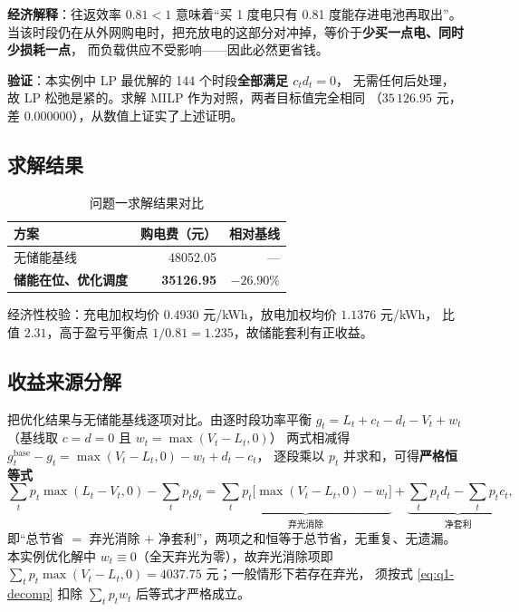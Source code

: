 \textbf{经济解释}：往返效率 $0.81<1$ 意味着“买 1 度电只有 0.81 度能存进电池再取出”。
当该时段仍在从外网购电时，把充放电的这部分对冲掉，等价于\textbf{少买一点电、同时少损耗一点}，
而负载供应不受影响——因此必然更省钱。

\textbf{验证}：本实例中 LP 最优解的 144 个时段\textbf{全部满足 $c_td_t=0$}，
无需任何后处理，故 LP 松弛是紧的。求解 MILP 作为对照，两者目标值完全相同
（$35\,126.95$ 元，差 $0.000000$），从数值上证实了上述证明。

\subsection{求解结果}

\begin{table}[H]
\centering
\caption{问题一求解结果对比}
\label{tab:q1-result}
\begin{tabular}{@{}l r r@{}}
\toprule
方案 & {购电费（元）} & {相对基线} \\
\midrule
无储能基线 & 48052.05 & — \\
\textbf{储能在位、优化调度} & \bfseries 35126.95 & \bfseries $-26.90\%$ \\
\bottomrule
\end{tabular}
\end{table}

经济性校验：充电加权均价 $0.4930$ 元/kWh，放电加权均价 $1.1376$ 元/kWh，
比值 $2.31$，高于盈亏平衡点 $1/0.81=1.235$，故储能套利有正收益。

\subsection{收益来源分解}

把优化结果与无储能基线逐项对比。由逐时段功率平衡
$g_t=L_t+c_t-d_t-V_t+w_t$（基线取 $c=d=0$ 且 $w_t=\max(V_t-L_t,0)$）
两式相减得 $g_t^{\mathrm{base}}-g_t=\max(V_t-L_t,0)-w_t+d_t-c_t$，
逐段乘以 $p_t$ 并求和，可得\textbf{严格恒等式}
\begin{equation}
\sum_t p_t\max(L_t-V_t,0)-\sum_t p_tg_t
=\underbrace{\sum_t p_t\bigl[\max(V_t-L_t,0)-w_t\bigr]}_{\text{弃光消除}}
+\underbrace{\sum_t p_td_t-\sum_t p_tc_t}_{\text{净套利}},
\label{eq:q1-decomp}
\end{equation}
即“总节省 $=$ 弃光消除 $+$ 净套利”，两项之和恒等于总节省，无重复、无遗漏。
本实例优化解中 $w_t\equiv0$（全天弃光为零），故弃光消除项即
$\sum_t p_t\max(V_t-L_t,0)=4037.75$ 元；一般情形下若存在弃光，
须按式 \eqref{eq:q1-decomp} 扣除 $\sum_t p_tw_t$ 后等式才严格成立。

